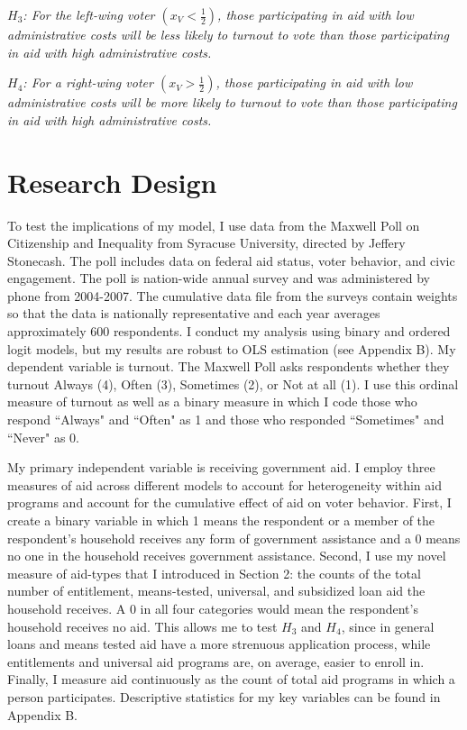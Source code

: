\documentclass[12pt]{paper}
\begin{document}
\textit{$H_3$: For the left-wing voter $(x_V < \frac{1}{2})$, those participating in aid with low administrative costs will be less likely to turnout to vote than those participating in aid with high administrative costs.}

\textit{$H_4$: For a right-wing voter $(x_V > \frac{1}{2})$, those participating in aid with low administrative costs will be more likely to turnout to vote than those participating in aid with high administrative costs.}

\section{Research Design}
To test the implications of my model, I use data from the Maxwell Poll on Citizenship and Inequality from Syracuse University, directed by Jeffery Stonecash. The poll includes data on federal aid status, voter behavior, and civic engagement. The poll is nation-wide annual survey and was administered by phone from 2004-2007. The cumulative data file from the surveys contain weights so that the data is nationally representative and each year averages approximately 600 respondents. I conduct my analysis using binary and ordered logit models, but my results are robust to OLS estimation (see Appendix B). My dependent variable is turnout. The Maxwell Poll asks respondents whether they turnout Always (4), Often (3), Sometimes (2), or Not at all (1). I use this ordinal measure of turnout as well as a binary measure in which I code those who respond ``Always" and ``Often" as 1 and those who responded ``Sometimes" and ``Never" as 0.

My primary independent variable is receiving government aid. I employ three measures of aid across different models to account for heterogeneity within aid programs and account for the cumulative effect of aid on voter behavior. First, I create a binary variable in which 1 means the respondent or a member of the respondent’s household receives any form of government assistance and a 0 means no one in the household receives government assistance. Second, I use my novel measure of aid-types that I introduced in Section 2: the counts of the total number of entitlement, means-tested, universal, and subsidized loan aid the household receives. A 0 in all four categories would mean the respondent’s household receives no aid. This allows me to test $H_3$ and $H_4$, since in general loans and means tested aid have a more strenuous application process, while entitlements and universal aid programs are, on average, easier to enroll in. Finally, I measure aid continuously as the count of total aid programs in which a person participates. Descriptive statistics for my key variables can be found in Appendix B.
\end{document}
